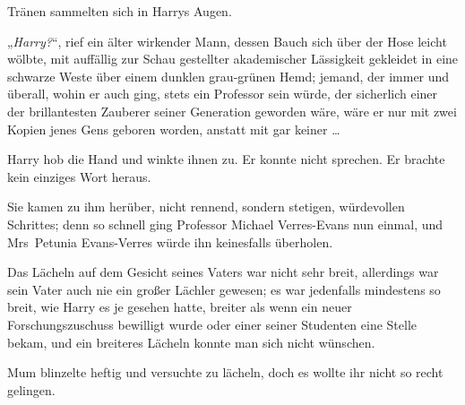 Tränen sammelten sich in Harrys Augen.

„\emph{Harry?}“, rief ein älter wirkender Mann, dessen Bauch sich über der Hose leicht wölbte, mit auffällig zur Schau gestellter akademischer Lässigkeit gekleidet in eine schwarze Weste über einem dunklen grau-grünen Hemd; jemand, der immer und überall, wohin er auch ging, stets ein Professor sein würde, der sicherlich einer der brillantesten Zauberer seiner Generation geworden wäre, wäre er nur mit zwei Kopien jenes Gens geboren worden, anstatt mit gar keiner …

Harry hob die Hand und winkte ihnen zu. Er konnte nicht sprechen. Er brachte kein einziges Wort heraus.

Sie kamen zu ihm herüber, nicht rennend, sondern stetigen, würdevollen Schrittes; denn so schnell ging Professor Michael Verres-Evans nun einmal, und Mrs~Petunia Evans-Verres würde ihn keinesfalls überholen.

Das Lächeln auf dem Gesicht seines Vaters war nicht sehr breit, allerdings war sein Vater auch nie ein großer Lächler gewesen; es war jedenfalls mindestens so breit, wie Harry es je gesehen hatte, breiter als wenn ein neuer Forschungszuschuss bewilligt wurde oder einer seiner Studenten eine Stelle bekam, und ein breiteres Lächeln konnte man sich nicht wünschen.

Mum blinzelte heftig und versuchte zu lächeln, doch es wollte ihr nicht so recht gelingen.

